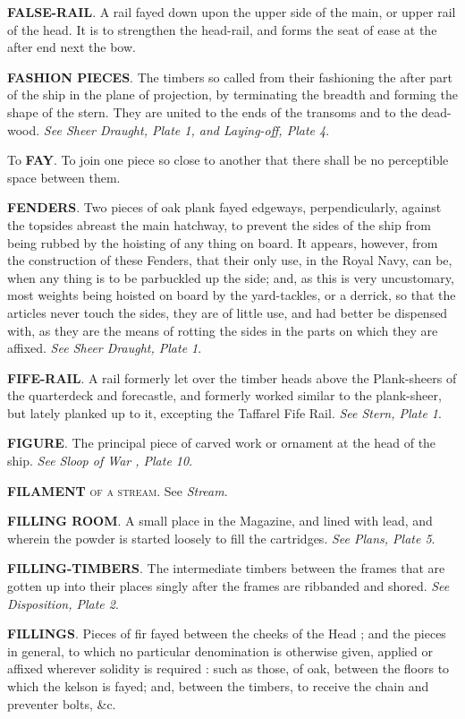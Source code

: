 \textbf{FALSE-RAIL}. A rail fayed down upon the upper side of the main, or upper rail of the head. It is to strengthen the head-rail, and forms the seat of ease at the after end next the bow. 

\textbf{FASHION PIECES}. The timbers so called from their fashioning the after part of the ship in the plane of projection, by terminating the breadth and forming the shape of the stern. They are united to the ends of the transoms and to the dead-wood. \textit{See Sheer Draught, Plate 1, and Laying-off, Plate 4}. 

To \textbf{FAY}. To join one piece so close to another that there shall be no perceptible space between them. 

\textbf{FENDERS}. Two pieces of oak plank fayed edgeways, perpendicularly, against the topsides abreast the main hatchway, to prevent the sides of the ship from being rubbed by the hoisting of any thing on board. It appears, however, from the construction of these Fenders, that their only use, in the Royal Navy, can be, when any thing is to be parbuckled up the side; and, as this is very uncustomary, most weights being hoisted on board by the yard-tackles, or a derrick, so that the articles never touch the sides, they are of little use, and had better be dispensed with, as they are the means of rotting the sides in the parts on which they are affixed. \textit{See Sheer Draught, Plate 1}. 

\textbf{FIFE-RAIL}. A rail formerly let over the timber heads above the Plank-sheers of the quarterdeck and forecastle, and formerly worked similar to the plank-sheer, but lately planked up to it, excepting the Taffarel Fife Rail. \textit{See Stern, Plate 1}. 

\textbf{FIGURE}. The principal piece of carved work or ornament at the head of the ship. \textit{See Sloop of War , Plate 10}. 

\textbf{FILAMENT} \textsc{of a stream}. See \textit{Stream}. 

\textbf{FILLING ROOM}. A small place in the Magazine, and lined with lead, and wherein the powder is started loosely to fill the cartridges. \textit{See Plans, Plate 5}. 

\textbf{FILLING-TIMBERS}. The intermediate timbers between the frames that are gotten up into their places singly after the frames are ribbanded and shored. \textit{See Disposition, Plate 2}. 

\textbf{FILLINGS}. Pieces of fir fayed between the cheeks of the Head ; and the pieces in general, to which no particular denomination is otherwise given, applied or affixed wherever solidity is required : such as those, of oak, between the floors to which the kelson is fayed; and, between the timbers, to receive the chain and preventer bolts, \&c. 

